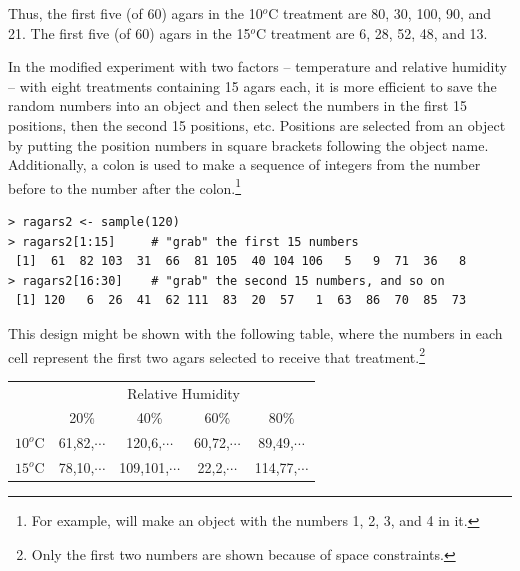 \documentclass[10pt,openany]{book}\usepackage[]{graphicx}\usepackage[]{color}
\makeatletter
\newenvironment{kframe}{%
 \def\at@end@of@kframe{}%
 \ifinner\ifhmode%
  \def\at@end@of@kframe{\end{minipage}}%
  \begin{minipage}{\columnwidth}%
 \fi\fi%
 \def\FrameCommand##1{\hskip\@totalleftmargin \hskip-\fboxsep
 \colorbox{shadecolor}{##1}\hskip-\fboxsep
     \hskip-\linewidth \hskip-\@totalleftmargin \hskip\columnwidth}%
 \MakeFramed {\advance\hsize-\width
   \@totalleftmargin\z@ \linewidth\hsize
   \@setminipage}}%
 {\par\unskip\endMakeFramed%
 \at@end@of@kframe}
\newenvironment{knitrout}{}{} %
\makeatother
\begin{document}
Thus, the first five (of 60) agars in the 10$^{o}$C treatment are 80, 30, 100, 90, and 21. The first five (of 60) agars in the 15$^{o}$C treatment are 6, 28, 52, 48, and 13.

In the modified experiment with two factors -- temperature and relative humidity -- with eight treatments containing 15 agars each, it is more efficient to save the random numbers into an object and then select the numbers in the first 15 positions, then the second 15 positions, etc. Positions are selected from an object by putting the position numbers in square brackets following the object name. Additionally, a colon is used to make a sequence of integers from the number before to the number after the colon.\footnote{For example,  will make an object with the numbers 1, 2, 3, and 4 in it.}
\begin{knitrout}
\color{fgcolor}\begin{kframe}
\begin{verbatim}
> ragars2 <- sample(120)
> ragars2[1:15]     # "grab" the first 15 numbers
 [1]  61  82 103  31  66  81 105  40 104 106   5   9  71  36   8
> ragars2[16:30]    # "grab" the second 15 numbers, and so on
 [1] 120   6  26  41  62 111  83  20  57   1  63  86  70  85  73
\end{verbatim}
\end{kframe}
\end{knitrout}

This design might be shown with the following table, where the numbers in each cell represent the first two agars selected to receive that treatment.\footnote{Only the first two numbers are shown because of space constraints.}

\begin{center}
\begin{tabular}{cc|c|c|c}
 & \multicolumn{4}{c}{Relative Humidity} \\
\cline{2-5}
 & 20\% & 40\% & 60\% & 80\% \\
\cline{2-5}
\multicolumn{1}{c|}{$10^{o}$C} & 61,82,$\cdots$ & 120,6,$\cdots$ & 60,72,$\cdots$ & \multicolumn{1}{c|}{89,49,$\cdots$} \\
\hline
\multicolumn{1}{c|}{$15^{o}$C} & 78,10,$\cdots$ & 109,101,$\cdots$ & 22,2,$\cdots$ & \multicolumn{1}{c|}{114,77,$\cdots$} \\
\cline{2-5}
\end{tabular}
\end{center}

\end{document}
